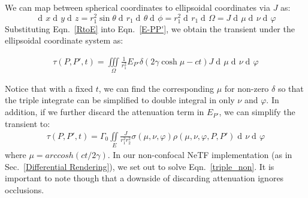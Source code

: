 \documentclass[10pt,journal,compsoc]{IEEEtran}
\DeclareMathOperator{\di}{d\!}
\begin{document}
\begin{appendices}
We can map between spherical coordinates to ellipsoidal coordinates via $J$ as:
\begin{equation}
\di{x} \di{y} \di{z} = r_1^2 \sin{\theta} \di{r_1} \di{\theta} \di{\phi} = r_1^2 \di{r_1} \di{\Omega}= J \di{\mu} \di{\nu} \di{\varphi}
\label{RtoE}
\end{equation}
Substituting Eqn.~\ref{RtoE} into Eqn.~\ref{E-PP'}, we obtain the transient under the ellipsoidal coordinate system as:

\begin{equation}
\begin{aligned}
\tau(P,P',t) = \underset{\Omega}\iiint \frac{1}{r_1^2} E_{P'} \delta\left(2\gamma\cosh{\mu}-ct\right) J \di{\mu} \di{\nu} \di{\varphi} 
\label{E'-PP'-}
\end{aligned}
\end{equation}

Notice that with a fixed $t$, we can find the corresponding $\mu$ for non-zero $\delta$ so that the triple integrate can be simplified to double integral in only $\nu$ and $\varphi$. In addition, if we further discard the attenuation term in $E_{P'}$, we can simplify the transient to: 
\begin{equation}
\begin{split}
    \tau(P,P',t) = \Gamma_{0} \underset{E}{\iint} \frac{J}{r_1^2 r_2^2}
    \sigma(\mu, \nu,\varphi) \rho(\mu, \nu,\varphi,P,P') \di{\nu} \di{\varphi}
\end{split}
\label{triple_non}
\end{equation}
where $\mu = arccosh(ct / 2\gamma)$.  In our non-confocal NeTF implementation (as in Sec.~\ref{Differential Rendering}), we set out to solve Eqn.~\ref{triple_non}. It is important to note though that a downside of discarding attenuation ignores occlusions. 


\end{appendices}
\end{document}
